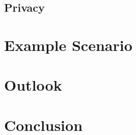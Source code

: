 \documentclass[journal]{IEEEtran}
\begin{document}
\subsection{Privacy}

\section{Example Scenario}
\label{es}

\section{Outlook}
\label{outlook}

\section{Conclusion}
\label{sec:conclusion}

\begin{spacing}{0.3}
%
%
\end{spacing}

\end{document}
